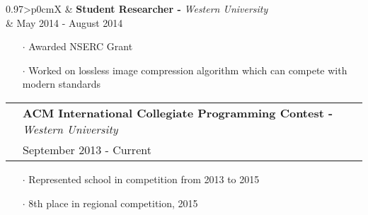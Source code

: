 \documentclass[letterpaper, oneside, final]{scrartcl} %
\newcommand{\gray}{\rowcolor[gray]{.90}} %
\begin{document}
\begin{center}
\begin{tabularx}{0.97\linewidth}{>{\raggedleft\scshape}p{0cm}X}
\gray & \textbf{Student Researcher -} \textit{Western University}\\
\gray & {May 2014 - August 2014}\\
\end{tabularx}
\vspace{-0.1cm}
\begin{itemize}\itemsep-0.2cm
\item[$\cdot$] Awarded NSERC Grant
\item[$\cdot$] Worked on lossless image compression algorithm which can compete with modern standards\\
\end{itemize}



\vspace{-0.05cm}


\vspace{-0.05cm}

\begin{tabularx}{0.97\linewidth}{>{\raggedleft\scshape}p{0cm}X}
\gray & \textbf{ACM International Collegiate Programming Contest -} \textit{Western University}\\
\gray & {September 2013 - Current}\	\
\end{tabularx}
\vspace{-0.1cm}
\begin{itemize} \itemsep-0.2cm
\item[$\cdot$] Represented school in competition from 2013 to 2015
\item[$\cdot$] 8th place in regional competition, 2015 \\
\end{itemize}



\end{center}
\end{document}
